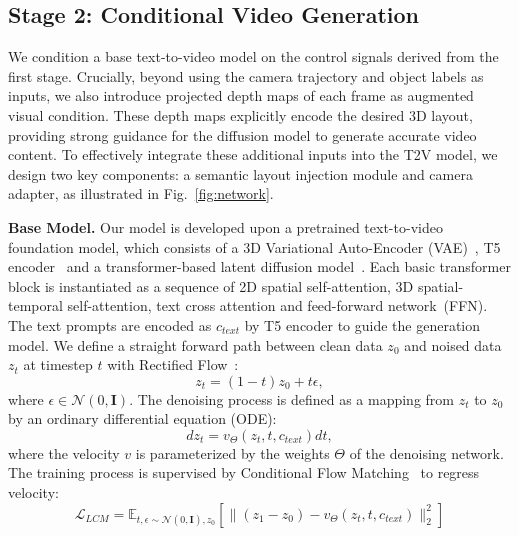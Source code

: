 \subsection{Stage 2: Conditional Video Generation}
\label{sec:method_stage_2}
We condition a base text-to-video model on the control signals derived from the first stage. Crucially, beyond using the camera trajectory and object labels as inputs, we also introduce projected depth maps of each frame as augmented visual condition. These depth maps explicitly encode the desired 3D layout, providing strong guidance for the diffusion model to generate accurate video content. To effectively integrate these additional inputs into the T2V model, we design two key components: a semantic layout injection module and camera adapter, as illustrated in Fig.~\ref{fig:network}.



\noindent\textbf{Base Model.} Our model is developed upon a pretrained text-to-video foundation model, which consists of a 3D Variational Auto-Encoder (VAE)~\cite{kingma2013auto}, T5 encoder~\cite{raffel2020exploring} and a transformer-based latent diffusion model~\cite{peebles2023scalable,chen2023pixart}. Each basic transformer block is instantiated as a sequence of 2D spatial self-attention, 3D spatial-temporal self-attention, text cross attention and feed-forward network~(FFN). The text prompts are encoded as $c_{text}$ by T5 encoder to guide the generation model. We define a straight forward path between clean data $z_0$ and noised data $z_t$ at timestep $t$ with Rectified Flow~\cite{esser2024scaling}:
\begin{equation}
\label{add_noise}
     z_t = (1-t)z_0 + t\epsilon,
\end{equation}
where $\epsilon\in\mathcal{N}(0,\mathbf{I})$. The denoising process is defined as a mapping from $z_t$ to $z_0$ by an ordinary differential equation (ODE):
\begin{equation}
\label{denoise}
     dz_t = v_{\Theta}(z_t,t,c_{text})dt,
\end{equation}
where the velocity $v$ is parameterized by the weights $\Theta$ of the denoising network. The training process is supervised by Conditional Flow Matching~\cite{lipman2022flow} to regress velocity:
\begin{equation}
\label{lcm_loss}
     \mathcal{L}_{LCM} = \mathbb{E}_{t,\epsilon\sim\mathcal{N}(0,\mathbf{I}),z_0}\left[\|(z_1-z_0)-v_{\Theta}(z_t,t,c_{text})\|^2_2\right]
\end{equation}



